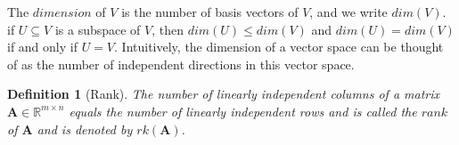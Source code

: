 \documentclass{article}
\newtheorem{definition}{Definition}[section]
\begin{document}
	The $\textit{dimension}$ of $\textit{V}$ is the number of basis vectors of $\textit{V}$, and we write $dim(\mathit{V})$. if $\mathit{U} \subseteq \mathit{V}$ is a subspace of $\mathit{V}$, then $dim(\mathit{U}) \le dim(\mathit{V})$ and $dim(\mathit{U}) = dim(\mathit{V})$ if and only if $\mathit{U} = \mathit{V}$. Intuitively, the dimension of a vector space can be thought of as the number of independent directions in this vector space. 
	\begin{definition}[Rank]
		\normalfont The number of linearly independent columns of a matrix $\textbf{A} \in \mathbb{R}^{m \times n}$ equals the number of linearly independent rows and is called the $\textit{rank}$ of $\textbf{A}$ and is denoted by $rk(\textbf{A})$.
	\end{definition}
\end{document}
